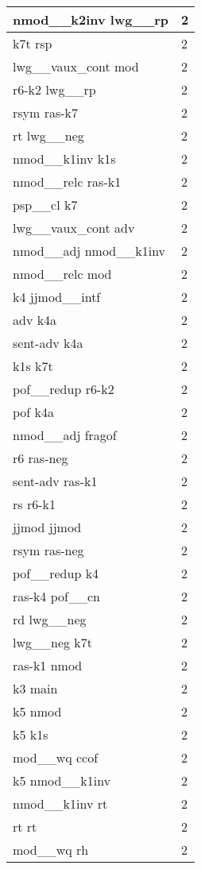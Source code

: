 \documentclass[a4 paper]{article}
\begin{document}
\begin{longtable}{p{}p{}}
nmod\_\_k2inv lwg\_\_rp  & 2 \\ \midrule
k7t rsp  & 2 \\ \midrule
lwg\_\_vaux\_cont mod  & 2 \\ \midrule
r6-k2 lwg\_\_rp  & 2 \\ \midrule
rsym ras-k7  & 2 \\ \midrule
rt lwg\_\_neg  & 2 \\ \midrule
nmod\_\_k1inv k1s  & 2 \\ \midrule
nmod\_\_relc ras-k1  & 2 \\ \midrule
psp\_\_cl k7  & 2 \\ \midrule
lwg\_\_vaux\_cont adv  & 2 \\ \midrule
nmod\_\_adj nmod\_\_k1inv  & 2 \\ \midrule
nmod\_\_relc mod  & 2 \\ \midrule
k4 jjmod\_\_intf  & 2 \\ \midrule
adv k4a  & 2 \\ \midrule
sent-adv k4a  & 2 \\ \midrule
k1s k7t  & 2 \\ \midrule
pof\_\_redup r6-k2  & 2 \\ \midrule
pof k4a  & 2 \\ \midrule
nmod\_\_adj fragof  & 2 \\ \midrule
r6 ras-neg  & 2 \\ \midrule
sent-adv ras-k1  & 2 \\ \midrule
rs r6-k1  & 2 \\ \midrule
jjmod jjmod  & 2 \\ \midrule
rsym ras-neg  & 2 \\ \midrule
pof\_\_redup k4  & 2 \\ \midrule
ras-k4 pof\_\_cn  & 2 \\ \midrule
rd lwg\_\_neg  & 2 \\ \midrule
lwg\_\_neg k7t  & 2 \\ \midrule
ras-k1 nmod  & 2 \\ \midrule
k3 main  & 2 \\ \midrule
k5 nmod  & 2 \\ \midrule
k5 k1s  & 2 \\ \midrule
mod\_\_wq ccof  & 2 \\ \midrule
k5 nmod\_\_k1inv  & 2 \\ \midrule
nmod\_\_k1inv rt  & 2 \\ \midrule
rt rt  & 2 \\ \midrule
mod\_\_wq rh  & 2 \\ \midrule

\end{longtable}
\end{document}
